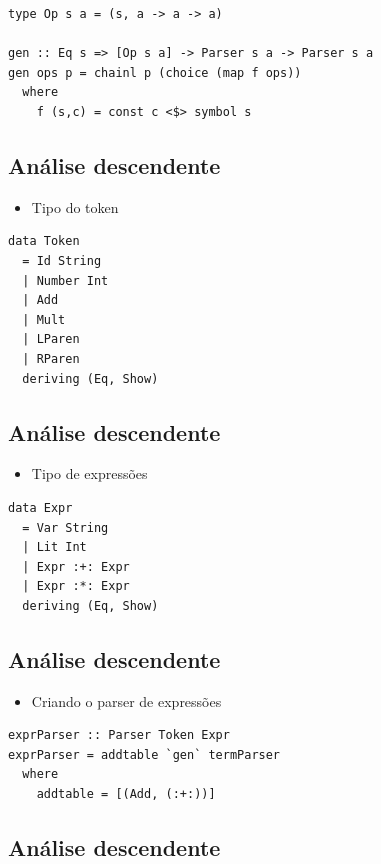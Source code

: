 \documentclass[11pt]{article}
\begin{document}
\begin{verbatim}
type Op s a = (s, a -> a -> a)

gen :: Eq s => [Op s a] -> Parser s a -> Parser s a
gen ops p = chainl p (choice (map f ops))
  where
    f (s,c) = const c <$> symbol s
\end{verbatim}
\subsection*{Análise descendente}
\label{sec:org1ff8252}

\begin{itemize}
\item Tipo do token
\end{itemize}

\begin{verbatim}
data Token
  = Id String
  | Number Int
  | Add
  | Mult
  | LParen
  | RParen
  deriving (Eq, Show)
\end{verbatim}
\subsection*{Análise descendente}
\label{sec:org127e110}

\begin{itemize}
\item Tipo de expressões
\end{itemize}

\begin{verbatim}
data Expr
  = Var String
  | Lit Int
  | Expr :+: Expr
  | Expr :*: Expr
  deriving (Eq, Show)
\end{verbatim}
\subsection*{Análise descendente}
\label{sec:org262d376}

\begin{itemize}
\item Criando o parser de expressões
\end{itemize}

\begin{verbatim}
exprParser :: Parser Token Expr
exprParser = addtable `gen` termParser
  where
    addtable = [(Add, (:+:))]
\end{verbatim}
\subsection*{Análise descendente}
\label{sec:org0915dfa}
\end{document}
